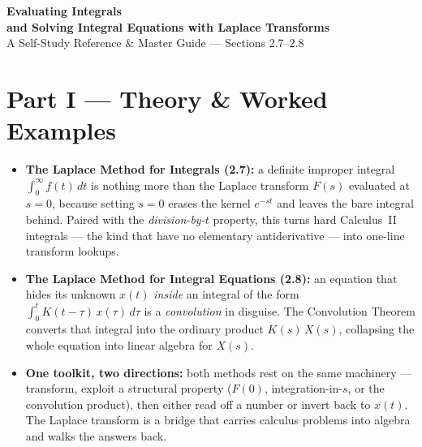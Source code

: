 \documentclass[11pt]{article}
\begin{document}
\begin{center}
    {\Large\bfseries\color{headerblue} Evaluating Integrals\\[2pt] and Solving Integral Equations with Laplace Transforms}\\[6pt]
    \large A Self-Study Reference \& Master Guide --- Sections 2.7--2.8
\end{center}
\vspace{0.4cm}

\tableofcontents
\vspace{0.8cm}

{}
\section*{Part I --- Theory \& Worked Examples}
\setcounter{section}{2}
\setcounter{subsection}{6}

\begin{topicsbox}
\begin{itemize}[leftmargin=*, itemsep=2pt]
  \item \textbf{The Laplace Method for Integrals (2.7):} a definite improper integral $\int_0^\infty f(t)\,dt$ is nothing more than the Laplace transform $F(s)$ evaluated at $s=0$, because setting $s=0$ erases the kernel $e^{-st}$ and leaves the bare integral behind. Paired with the \emph{division-by-$t$} property, this turns hard Calculus~II integrals --- the kind that have no elementary antiderivative --- into one-line transform lookups.
  \item \textbf{The Laplace Method for Integral Equations (2.8):} an equation that hides its unknown $x(t)$ \emph{inside} an integral of the form $\int_0^t K(t-\tau)\,x(\tau)\,d\tau$ is a \emph{convolution} in disguise. The Convolution Theorem converts that integral into the ordinary product $K(s)\,X(s)$, collapsing the whole equation into linear algebra for $X(s)$.
  \item \textbf{One toolkit, two directions:} both methods rest on the same machinery --- transform, exploit a structural property ($F(0)$, integration-in-$s$, or the convolution product), then either read off a number or invert back to $x(t)$. The Laplace transform is a bridge that carries calculus problems into algebra and walks the answers back.
\end{itemize}
\end{topicsbox}
\end{document}
